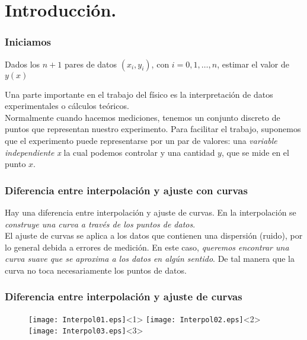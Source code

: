\section{Introducción.}
\begin{frame}
\frametitle{Iniciamos}
Dados los $n+1$ pares de datos $(x_{i},y_{i})$, con $i=0,1,\ldots,n$, estimar el valor de $y(x)$
\end{frame}
\begin{frame}
Una parte importante en el trabajo del físico es la interpretación de datos experimentales o cálculos teóricos.
\\
\bigskip
Normalmente cuando hacemos mediciones, tenemos un conjunto discreto de puntos que representan nuestro experimento. Para facilitar el trabajo, suponemos que el experimento puede representarse por un par de valores: una \textit{variable independiente x} la cual podemos controlar y una cantidad $y$, que se mide en el punto $x$.
\end{frame}
\begin{frame}
\frametitle{Diferencia entre interpolación y ajuste con curvas}
Hay una diferencia entre interpolación y ajuste de curvas. En la interpolación se \emph{construye una curva a través de los puntos de datos}.
\\
\medskip
El ajuste de curvas se aplica a los datos que contienen una dispersión (ruido), por lo general debida a errores de medición. En este caso, \emph{queremos encontrar una curva suave que se aproxima a los datos en algún sentido}. De tal manera que la curva no toca necesariamente los puntos de datos.
\end{frame}
\begin{frame}[fragile]
\frametitle{Diferencia entre interpolación y ajuste de curvas}

\begin{figure}
\centering
\texttt{[image: Interpol01.eps]}<1>
\texttt{[image: Interpol02.eps]}<2>
\texttt{[image: Interpol03.eps]}<3>
\end{figure}
\end{frame}
